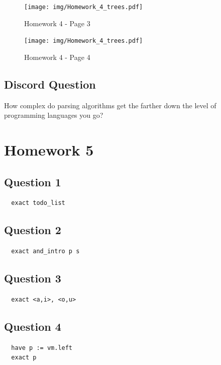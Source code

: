 \documentclass{article}
\theoremstyle{plain}
\theoremstyle{definition}
\theoremstyle{remark}
\begin{document}
\begin{figure}[H]
  \centering
  \texttt{[image: img/Homework\_4\_trees.pdf]}
  \caption{Homework 4 - Page 3}
  \label{fig:homework4_page3}
\end{figure}

\begin{figure}[H]
  \centering
  \texttt{[image: img/Homework\_4\_trees.pdf]}
  \caption{Homework 4 - Page 4}
  \label{fig:homework4_page4}
\end{figure}

\subsection{Discord Question}

How complex do parsing algorithms get the farther down the level of programming languages you go?


\section{Homework 5}\label{homework5}

\subsection{Question 1}

\begin{lstlisting}
  exact todo_list
\end{lstlisting}

\subsection{Question 2}

\begin{lstlisting}
  exact and_intro p s
\end{lstlisting}

\subsection{Question 3}

\begin{lstlisting}
  exact <a,i>, <o,u>
\end{lstlisting}

\subsection{Question 4}

\begin{lstlisting}
  have p := vm.left
  exact p
\end{lstlisting}
\end{document}
